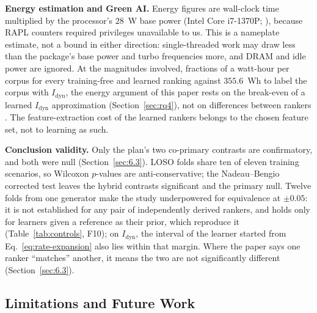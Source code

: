 \documentclass[preprint,3p]{elsarticle}
\begin{document}
\noindent\textbf{Energy estimation and Green AI.} Energy figures are wall-clock time multiplied by the processor's $28$~W base power (Intel Core i7-1370P; ), because RAPL counters required privileges unavailable to us. This is a nameplate estimate, not a bound in either direction: single-threaded work may draw less than the package's base power and turbo frequencies more, and DRAM and idle power are ignored. At the magnitudes involved, fractions of a watt-hour per corpus for every training-free and learned ranking against $355.6$~Wh to label the corpus with $I_{\text{dyn}}$, the energy argument of this paper rests on the break-even of a learned $I_{\text{dyn}}$ approximation (Section~\ref{sec:rq4}), not on differences between rankers \cite{schwartz2020greenai,verdecchia2023greenai}. The feature-extraction cost of the learned rankers belongs to the chosen feature set, not to learning as such.

\noindent\textbf{Conclusion validity.} Only the plan's two co-primary contrasts are confirmatory, and both were null (Section~\ref{sec:6.3}). LOSO folds share ten of eleven training scenarios, so Wilcoxon $p$-values are anti-conservative; the Nadeau--Bengio corrected test leaves the hybrid contrasts significant and the primary null. Twelve folds from one generator make the study underpowered for equivalence at $\pm 0.05$: it is not established for any pair of independently derived rankers, and holds only for learners given a reference as their prior, which reproduce it (Table~\ref{tab:controls}, F10); on $I_{\text{dyn}}$, the interval of the learner started from Eq.~\eqref{eq:rate-expansion} also lies within that margin. Where the paper says one ranker ``matches'' another, it means the two are not significantly different (Section~\ref{sec:6.3}).

\subsection{Limitations and Future Work}
\label{sec:8.4}
\label{sec:limitations}
\end{document}
